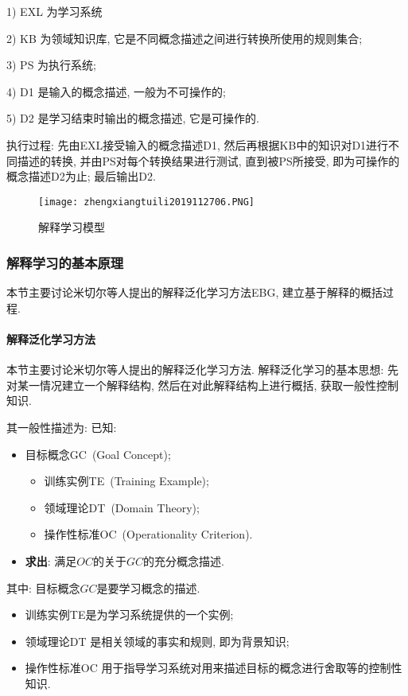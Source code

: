 1) EXL 为学习系统

2) KB 为领域知识库, 它是不同概念描述之间进行转换所使用的规则集合;

3) PS 为执行系统;

4) D1 是输入的概念描述, 一般为不可操作的;

5) D2 是学习结束时输出的概念描述, 它是可操作的.

执行过程: 先由EXL接受输入的概念描述D1, 然后再根据KB中的知识对D1进行不同描述的转换, 并由PS对每个转换结果进行测试, 直到被PS所接受, 即为可操作的概念描述D2为止; 最后输出D2.

\begin{figure}[H]
\centering
\texttt{[image: zhengxiangtuili2019112706.PNG]}
\caption{解释学习模型}
\label{AI32fig2706}
\end{figure}
\subsubsection{解释学习的基本原理}
本节主要讨论米切尔等人提出的解释泛化学习方法EBG, 建立基于解释的概括过程.
\paragraph{解释泛化学习方法}
本节主要讨论米切尔等人提出的解释泛化学习方法.
解释泛化学习的基本思想: 先对某一情况建立一个解释结构, 然后在对此解释结构上进行概括, 获取一般性控制知识.

其一般性描述为: 已知:
\begin{itemize}
\item 目标概念GC\, (Goal Concept);
   \begin{itemize}
         \item 训练实例TE\, (Training Example);
         \item 领域理论DT\, (Domain Theory);
         \item 操作性标准OC\, (Operationality Criterion).
   \end{itemize}
\item \textbf{求出}: 满足$OC$的关于$GC$的充分概念描述.
\end{itemize}
其中: 目标概念$GC$是要学习概念的描述.

\begin{itemize}
    \item 训练实例TE是为学习系统提供的一个实例;
    \item 领域理论DT 是相关领域的事实和规则, 即为背景知识;
    \item 操作性标准OC 用于指导学习系统对用来描述目标的概念进行舍取等的控制性知识.
\end{itemize}

